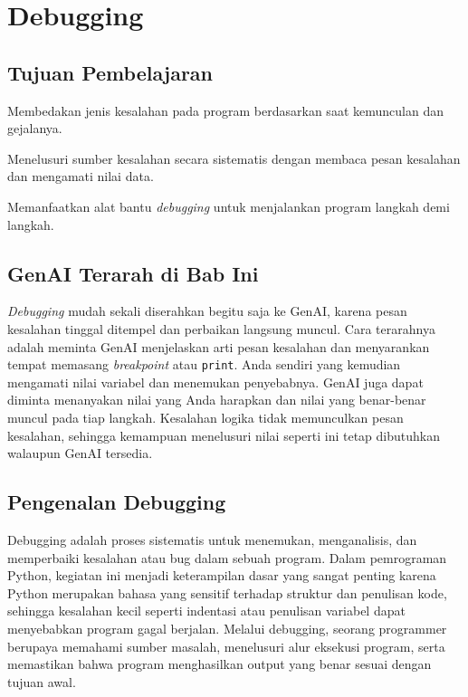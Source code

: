 \chapter{Debugging}

\section*{Tujuan Pembelajaran}
\begin{daftarrapat}
  \item Membedakan jenis kesalahan pada program berdasarkan saat kemunculan dan gejalanya.
  \item Menelusuri sumber kesalahan secara sistematis dengan membaca pesan kesalahan dan mengamati nilai data.
  \item Memanfaatkan alat bantu \textit{debugging} untuk menjalankan program langkah demi langkah.
\end{daftarrapat}

\section*{GenAI Terarah di Bab Ini}

\textit{Debugging} mudah sekali diserahkan begitu saja ke GenAI, karena pesan kesalahan tinggal ditempel dan perbaikan langsung muncul. Cara terarahnya adalah meminta GenAI menjelaskan arti pesan kesalahan dan menyarankan tempat memasang \textit{breakpoint} atau \texttt{print}. Anda sendiri yang kemudian mengamati nilai variabel dan menemukan penyebabnya. GenAI juga dapat diminta menanyakan nilai yang Anda harapkan dan nilai yang benar-benar muncul pada tiap langkah. Kesalahan logika tidak memunculkan pesan kesalahan, sehingga kemampuan menelusuri nilai seperti ini tetap dibutuhkan walaupun GenAI tersedia.

\section{Pengenalan Debugging}

Debugging adalah proses sistematis untuk menemukan, menganalisis, dan memperbaiki kesalahan atau bug dalam sebuah program. Dalam pemrograman Python, kegiatan ini menjadi keterampilan dasar yang sangat penting karena Python merupakan bahasa yang sensitif terhadap struktur dan penulisan kode, sehingga kesalahan kecil seperti indentasi atau penulisan variabel dapat menyebabkan program gagal berjalan. Melalui debugging, seorang programmer berupaya memahami sumber masalah, menelusuri alur eksekusi program, serta memastikan bahwa program menghasilkan output yang benar sesuai dengan tujuan awal.

